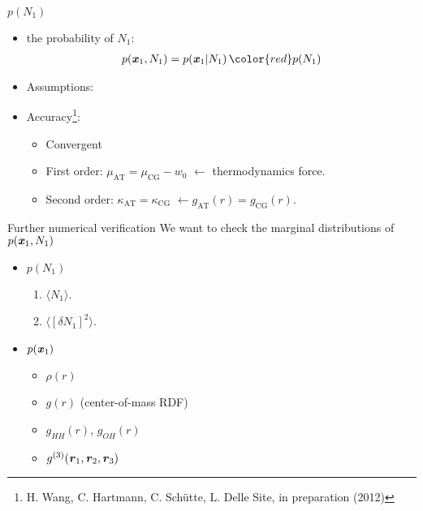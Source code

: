 \documentclass{beamer}
\newcommand{\redc}[1]{{\color{red} #1}}
\newcommand{\bluec}[1]{{\color{blue} #1}}
\newcommand{\vect}[1]{\textbf{\textit{#1}}}
\newcommand{\AT}{{\textrm{{AT}}}}
\newcommand{\CG}{{\textrm{CG}}}
\begin{document}
\begin{frame}{$p(N_1)$}
  \begin{itemize}
    \vfill
  \item <1-> the probability of $N_1$: 
    \begin{align*}
      p(\vect x_1, N_1) = p(\vect x_1 | N_1) \, \redc{p (N_1)}
    \end{align*}
    \vfill
  \item <2-> Assumptions:
    \vfill
    \vfill
  \item <3-> Accuracy\footnote{H. Wang, C. Hartmann, C. Sch\"utte, L. Delle Site, in preparation (2012)}:
    \vfill
    \begin{itemize}
    \item \redc{Convergent}
    \vfill
    \item First order: \redc{$\mu_{\AT} = \mu_{\CG} - w_0$}
      $\leftarrow$ thermodynamics force.
    \vfill
  \item Second order: \redc{$\kappa_{\AT} = \kappa_{\CG}$}
    $\leftarrow g_{\AT}(r) = g_{\CG}(r)$.
    \end{itemize}
    \vfill
  \end{itemize}
\end{frame}


\begin{frame}{Further numerical verification}
  We want to check the marginal distributions of $p(\vect x_1, N_1)$
  \begin{itemize}
    \vfill
  \item <1-> $p(N_1)$
    \vfill
    \begin{enumerate}
    \item  $\langle N_1\rangle$.
      \vfill
    \item  $\langle [\delta N_1]^2\rangle$.
    \end{enumerate}
    \vfill
  \item <2-> $p(\vect x_1)$
    \begin{itemize}
    \vfill
    \item  $\rho(r)$
      \vfill
    \item $g(r)$ (center-of-mass RDF)
      \vfill
    \item \redc{$g_{HH}(r)$, $g_{OH}(r)$}
      \vfill
    \item \redc{$g^{(3)} (\vect r_1, \vect r_2, \vect r_3)$}
    \end{itemize}
    \vfill
  \end{itemize}
\end{frame}
\end{document}
